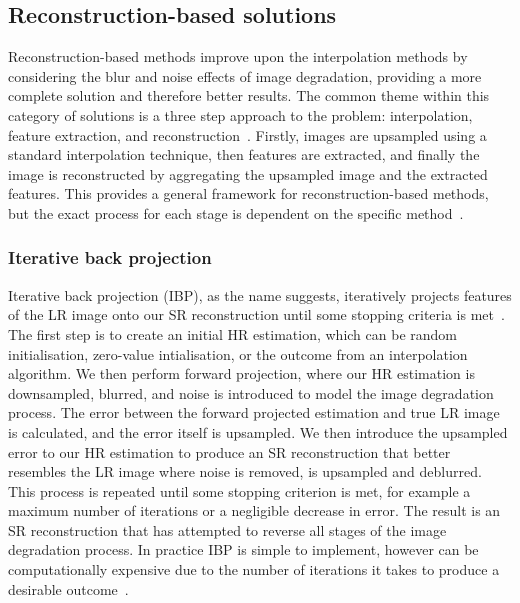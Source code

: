 \subsection{Reconstruction-based solutions}
Reconstruction-based methods improve upon the interpolation methods by considering the blur and noise effects of image degradation, providing a more complete solution and therefore better results. The common theme within this category of solutions is a three step approach to the problem: interpolation, feature extraction, and reconstruction~\cite{superResRemoteSensingOverview}. Firstly, images are upsampled using a standard interpolation technique, then features are extracted, and finally the image is reconstructed by aggregating the upsampled image and the extracted features. This provides a general framework for reconstruction-based methods, but the exact process for each stage is dependent on the specific method~\cite{superResRemoteSensingOverview}.

\subsubsection{Iterative back projection}
Iterative back projection (IBP), as the name suggests, iteratively projects features of the LR image onto our SR reconstruction until some stopping criteria is met~\cite{ref}. The first step is to create an initial HR estimation, which can be random initialisation, zero-value intialisation, or the outcome from an interpolation algorithm. We then perform forward projection, where our HR estimation is downsampled, blurred, and noise is introduced to model the image degradation process. The error between the forward projected estimation and true LR image is calculated, and the error itself is upsampled. We then introduce the upsampled error to our HR estimation to produce an SR reconstruction that better resembles the LR image where noise is removed, is upsampled and deblurred. This process is repeated until some stopping criterion is met, for example a maximum number of iterations or a negligible decrease in error. The result is an SR reconstruction that has attempted to reverse all stages of the image degradation process. In practice IBP is simple to implement, however can be computationally expensive due to the number of iterations it takes to produce a desirable outcome~\cite{ref}.


